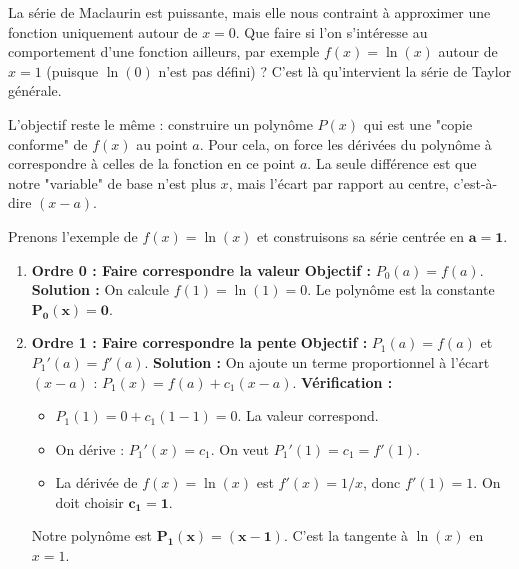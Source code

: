 \begin{intuitionbox}
La série de Maclaurin est puissante, mais elle nous contraint à approximer une fonction uniquement autour de $x=0$. Que faire si l'on s'intéresse au comportement d'une fonction ailleurs, par exemple $f(x)=\ln(x)$ autour de $x=1$ (puisque $\ln(0)$ n'est pas défini) ? C'est là qu'intervient la série de Taylor générale.

L'objectif reste le même : construire un polynôme $P(x)$ qui est une "copie conforme" de $f(x)$ au point $a$. Pour cela, on force les dérivées du polynôme à correspondre à celles de la fonction en ce point $a$. La seule différence est que notre "variable" de base n'est plus $x$, mais l'écart par rapport au centre, c'est-à-dire $(x-a)$.

Prenons l'exemple de $f(x) = \ln(x)$ et construisons sa série centrée en $\mathbf{a=1}$.

\begin{enumerate}
    \item \textbf{Ordre 0 : Faire correspondre la valeur}
    \newline
    \textbf{Objectif :} $P_0(a) = f(a)$.
    \newline
    \textbf{Solution :} On calcule $f(1) = \ln(1) = 0$. Le polynôme est la constante $\mathbf{P_0(x) = 0}$.

    \item \textbf{Ordre 1 : Faire correspondre la pente}
    \newline
    \textbf{Objectif :} $P_1(a) = f(a)$ et $P_1'(a) = f'(a)$.
    \newline
    \textbf{Solution :} On ajoute un terme proportionnel à l'écart $(x-a)$ : $P_1(x) = f(a) + c_1 (x-a)$.
    \newline
    \textbf{Vérification :}
    \begin{itemize}
        \item $P_1(1) = 0 + c_1(1-1) = 0$. La valeur correspond.
        \item On dérive : $P_1'(x) = c_1$. On veut $P_1'(1) = c_1 = f'(1)$.
        \item La dérivée de $f(x)=\ln(x)$ est $f'(x) = 1/x$, donc $f'(1)=1$. On doit choisir $\mathbf{c_1=1}$.
    \end{itemize}
    Notre polynôme est $\mathbf{P_1(x) = (x-1)}$. C'est la tangente à $\ln(x)$ en $x=1$.


\end{enumerate}
\end{intuitionbox}
